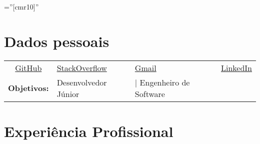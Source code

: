 \documentclass[a4paper,10pt]{article} %
\begin{document}
\pagestyle{empty} %

\font\fb=''[cmr10]'' %


\par{\bigskip\par} %

\section{Dados pessoais}

\begin{tabular}{clll}

	\faGithub \thinspace \href{https://github.com/Yuri-M-Dias}{GitHub}
	& \faStackOverflow \thinspace \href{http://stackoverflow.com/users/story/3312701}{StackOverflow}
	& \faEnvelopeO \thinspace \href{mailto:yurimathe.yp@gmail.com}{Gmail}
	& \faLinkedin \thinspace \href{https://www.linkedin.com/in/yuri-pereira-b5b589a8/}{LinkedIn} \\

	\bf Objetivos: & Desenvolvedor Júnior & | Engenheiro de Software & \\
\end{tabular}


\section{Experiência Profissional}
\end{document}
